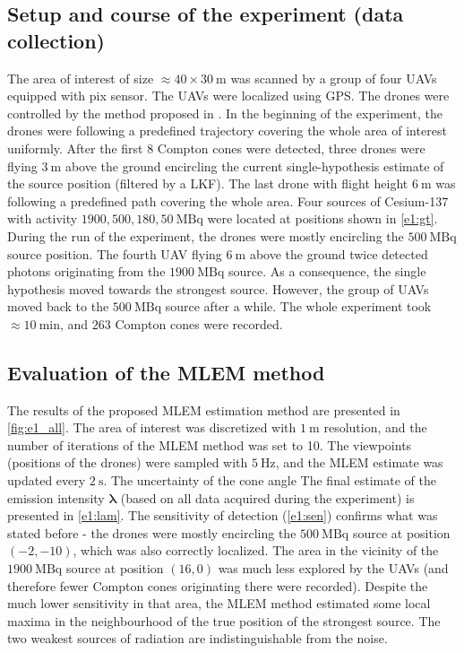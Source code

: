 \subsection{Setup and course of the experiment (data collection)}
The area of interest of size $\approx 40 \times 30\ \si{\meter}$ was scanned by a group of four \ac{UAV}s equipped with \ac{pix} sensor.
The \ac{UAV}s were localized using \ac{GPS}.
The drones were controlled by the method proposed in \cite{baca2021gamma}.
In the beginning of the experiment, the drones were following a predefined trajectory covering the whole area of interest uniformly.
After the first 8 Compton cones were detected, three drones were flying $\SI{3}{\meter}$ above the ground encircling the current single-hypothesis estimate of the source position (filtered by a \ac{LKF}). 
The last drone with flight height $\SI{6}{\meter}$ was following a predefined path covering the whole area.
Four sources of Cesium-137 with activity $1900, 500, 180, 50\ \si{\mega\becquerel}$ were located at positions shown in \autoref{e1:gt}.
During the run of the experiment, the drones were mostly encircling the $\SI{500}{\mega\becquerel}$ source position.
The fourth \ac{UAV} flying $\SI{6}{\meter}$ above the ground twice detected photons originating from the $\SI{1900}{\mega\becquerel}$ source. 
As a consequence, the single hypothesis moved towards the strongest source. However, the group of \ac{UAV}s moved back to the $\SI{500}{\mega\becquerel}$ source after a while.
The whole experiment took $\approx \SI{10}{\minute}$, and $263$ Compton cones were recorded.

\subsection{Evaluation of the MLEM method}
The results of the proposed \ac{MLEM} estimation method are presented in \autoref{fig:e1_all}.
The area of interest was discretized with $\SI{1}{\meter}$ resolution, and the number of iterations of the \ac{MLEM} method was set to 10.
The viewpoints (positions of the drones) were sampled with $\SI{5}{\hertz}$, and the \ac{MLEM} estimate was updated every $\SI{2}{\second}$.
The uncertainty of the cone angle  
The final estimate of the emission intensity $\bm{\lambda}$ (based on all data acquired during the experiment) is presented in \autoref{e1:lam}. 
The sensitivity of detection (\autoref{e1:sen}) confirms what was stated before - the drones were mostly encircling the $\SI{500}{\mega\becquerel}$ source at position $(-2, -10)$, which was also correctly localized.
The area in the vicinity of the $\SI{1900}{\mega\becquerel}$ source at position $(16, 0)$ was much less explored by the \ac{UAV}s (and therefore fewer Compton cones originating there were recorded).
Despite the much lower sensitivity in that area, the \ac{MLEM} method estimated some local maxima in the neighbourhood of the true position of the strongest source.
The two weakest sources of radiation are indistinguishable from the noise.



